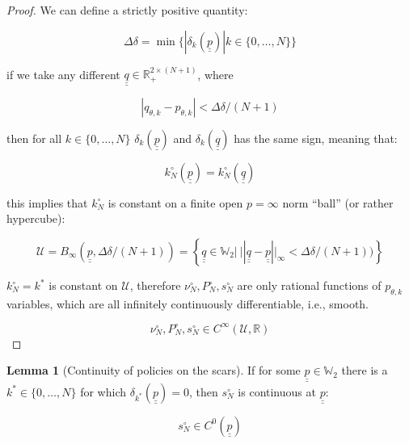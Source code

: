 \documentclass{article}
\theoremstyle{definition}
\newtheorem{lemma}{Lemma}[section]
\begin{document}
\begin{proof}
    We can define a strictly positive quantity:

    \begin{equation}
        \Delta \delta = \min \{|\delta_k(\underline{\underline{p}})| k \in \{0,\dots,N\}\}
    \end{equation}

    if we take any different $\underline{\underline{q}} \in \mathbb{R}_+^{2 \times (N+1)}$, where

    \begin{equation}
        |q_{\theta,k} - p_{\theta,k}| < \Delta \delta / (N+1)
    \end{equation}

    then for all $k \in \{0,\dots,N\}$ $\delta_k(\underline{\underline{p}})$ and $\delta_k(\underline{\underline{q}})$ has the same sign, meaning that:

    \begin{equation}
        k^\circ_N(\underline{\underline{p}}) = k^\circ_N(\underline{\underline{q}})
    \end{equation}

    this implies that $k^\circ_N$ is constant on a finite open $p=\infty$ norm ``ball'' (or rather hypercube):

    \begin{equation}
        \mathcal{U} = B_\infty(\underline{\underline{p}},\Delta \delta / (N+1)) = 
        \left \{ 
        \underline{\underline{q}} \in \mathbb{W}_2 | \ 
        ||\underline{\underline{q}} - \underline{\underline{p}}||_\infty < \Delta \delta / (N+1))
        \right \}
    \end{equation}

    $k^\circ_N = k^*$ is constant on $\mathcal{U}$, therefore $\nu^\circ_N, P^\circ_N, s^\circ_N$ are only rational functions of $p_{\theta,k}$ variables, which are all infinitely continuously differentiable, i.e., smooth.

    \begin{equation}
        \nu^\circ_N, P^\circ_N, s^\circ_N \in C^\infty(\mathcal{U}, \mathbb{R})
    \end{equation}
    
\end{proof}

\begin{lemma}[Continuity of policies on the scars]
    \label{lemma:ContinuityOfFisherPolicies}
    If for some $\underline{\underline{p}} \in \mathbb{W}_2$ there is a $k^* \in \{0,\dots,N\}$ for which $\delta_{k^*}(\underline{\underline{p}}) = 0$, then
    $s^\circ_N$ is continuous at $\underline{\underline{p}}$:
    
    \begin{equation}
        s^\circ_N \in C^0(\underline{\underline{p}})
    \end{equation}
    
\end{lemma}
\end{document}
